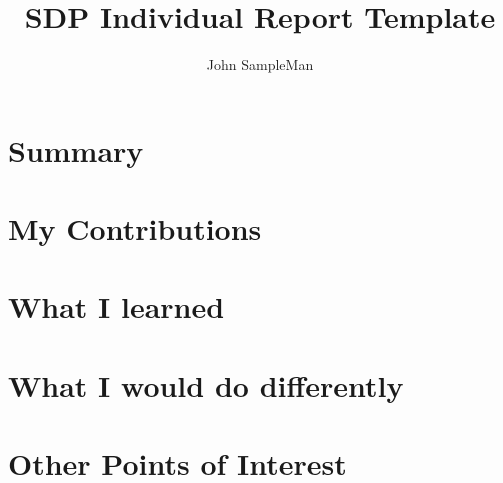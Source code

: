 \documentclass[12pt,a4paper]{article}
\begin{document}

\title{SDP Individual Report Template}
\author{John SampleMan}
\maketitle

\section{Summary}

\section{My Contributions}

\section{What I learned}

\section{What I would do differently}

\section{Other Points of Interest}
\end{document}
